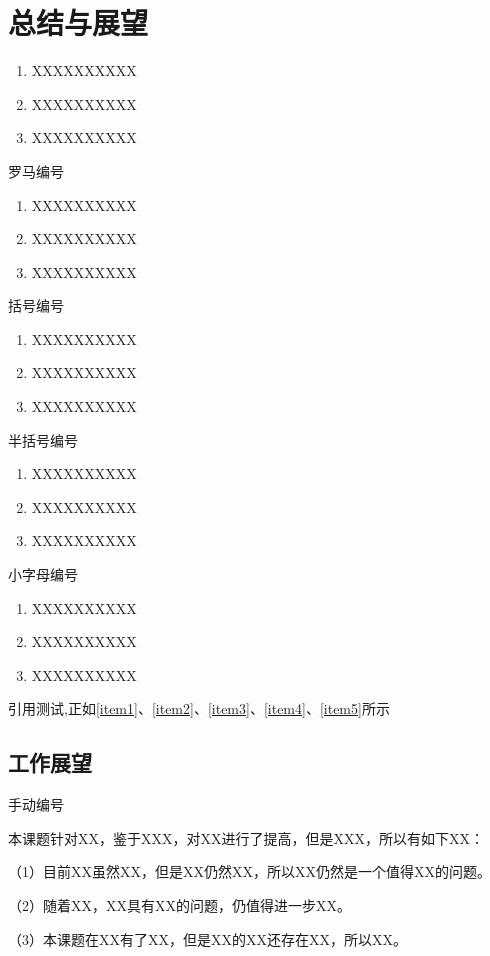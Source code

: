 \lipsum

\newpage


\section{总结与展望}

\begin{enumerate}[itemindent=2em]
 \item XXXXXXXXXX
 \label{item1}
 \item XXXXXXXXXX
 \item XXXXXXXXXX
\end{enumerate}
罗马编号
\begin{enumerate}[label=(\roman*),itemindent=2em]
 \item XXXXXXXXXX
 \label{item2}
 \item XXXXXXXXXX
 \item XXXXXXXXXX
\end{enumerate}
括号编号
\begin{enumerate}[label=(\arabic*),itemindent=2em]
 \item XXXXXXXXXX
 \label{item3}
 \item XXXXXXXXXX
 \item XXXXXXXXXX
\end{enumerate}
半括号编号
\begin{enumerate}[label=\arabic*),itemindent=2em]
 \item XXXXXXXXXX
 \label{item4}
 \item XXXXXXXXXX
 \item XXXXXXXXXX
\end{enumerate}
小字母编号
\begin{enumerate}[label=\alph*),itemindent=2em]
 \item XXXXXXXXXX
 \label{item5}
 \item XXXXXXXXXX
 \item XXXXXXXXXX
\end{enumerate}

引用测试,正如\ref{item1}、\ref{item2}、\ref{item3}、\ref{item4}、\ref{item5}所示

\subsection{工作展望}
手动编号 %
\par
本课题针对XX，鉴于XXX，对XX进行了提高，但是XXX，所以有如下XX：

（1）目前XX虽然XX，但是XX仍然XX，所以XX仍然是一个值得XX的问题。

（2）随着XX，XX具有XX的问题，仍值得进一步XX。

（3）本课题在XX有了XX，但是XX的XX还存在XX，所以XX。


\newpage
